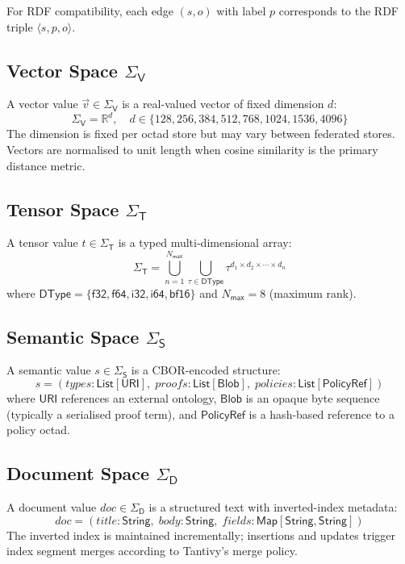 \documentclass[11pt,twocolumn]{article}
\begin{document}
For RDF compatibility, each edge $(s, o)$ with label $p$ corresponds to the
RDF triple $\langle s, p, o \rangle$.

\subsection{Vector Space $\Sigma_\mathsf{V}$}

A vector value $\vec{v} \in \Sigma_\mathsf{V}$ is a real-valued vector of
fixed dimension $d$:
\[
  \Sigma_\mathsf{V} = \mathbb{R}^d, \quad d \in \{128, 256, 384, 512, 768, 1024, 1536, 4096\}
\]
The dimension is fixed per octad store but may vary between federated stores.
Vectors are normalised to unit length when cosine similarity is the primary
distance metric.

\subsection{Tensor Space $\Sigma_\mathsf{T}$}

A tensor value $t \in \Sigma_\mathsf{T}$ is a typed multi-dimensional array:
\[
  \Sigma_\mathsf{T} = \bigcup_{n=1}^{N_\mathsf{max}}
    \bigcup_{\tau \in \mathsf{DType}}
    \tau^{d_1 \times d_2 \times \cdots \times d_n}
\]
where $\mathsf{DType} = \{\mathsf{f32}, \mathsf{f64}, \mathsf{i32}, \mathsf{i64},
\mathsf{bf16}\}$ and $N_\mathsf{max} = 8$ (maximum rank).

\subsection{Semantic Space $\Sigma_\mathsf{S}$}

A semantic value $s \in \Sigma_\mathsf{S}$ is a CBOR-encoded structure:
\[
  s = (\mathit{types} : \mathsf{List}[\mathsf{URI}],\;
       \mathit{proofs} : \mathsf{List}[\mathsf{Blob}],\;
       \mathit{policies} : \mathsf{List}[\mathsf{PolicyRef}])
\]
where $\mathsf{URI}$ references an external ontology, $\mathsf{Blob}$ is an
opaque byte sequence (typically a serialised proof term), and
$\mathsf{PolicyRef}$ is a hash-based reference to a policy octad.

\subsection{Document Space $\Sigma_\mathsf{D}$}

A document value $\mathit{doc} \in \Sigma_\mathsf{D}$ is a structured text
with inverted-index metadata:
\[
  \mathit{doc} = (\mathit{title} : \mathsf{String},\;
                  \mathit{body} : \mathsf{String},\;
                  \mathit{fields} : \mathsf{Map}[\mathsf{String}, \mathsf{String}])
\]
The inverted index is maintained incrementally; insertions and updates
trigger index segment merges according to Tantivy's merge policy.
\end{document}
